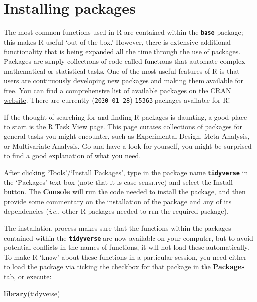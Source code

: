 \documentclass[
]{book}
\newenvironment{Shaded}{\begin{snugshade}}{\end{snugshade}}
\newcommand{\KeywordTok}[1]{\textcolor[rgb]{0.13,0.29,0.53}{\textbf{#1}}}
\newcommand{\NormalTok}[1]{#1}
\begin{document}
\hypertarget{installing-packages}{%
\section{Installing packages}\label{installing-packages}}

The most common functions used in R are contained within the \textbf{\texttt{base}} package; this makes R useful `out of the box.' However, there is extensive additional functionality that is being expanded all the time through the use of packages. Packages are simply collections of code called functions that automate complex mathematical or statistical tasks. One of the most useful features of R is that users are continuously developing new packages and making them available for free. You can find a comprehensive list of available packages on the \href{https://cran.r-project.org/web/packages/}{CRAN website}. There are currently (\texttt{2020-01-28}) \texttt{15363} packages available for R!

If the thought of searching for and finding R packages is daunting, a good place to start is the \href{http://cran.r-project.org/web/views/}{R Task View} page. This page curates collections of packages for general tasks you might encounter, such as Experimental Design, Meta-Analysis, or Multivariate Analysis. Go and have a look for yourself, you might be surprised to find a good explanation of what you need.

After clicking `Tools'/`Install Packages', type in the package name \textbf{\texttt{tidyverse}} in the `Packages' text box (note that it is case sensitive) and select the Install button. The \textbf{Console} will run the code needed to install the package, and then provide some commentary on the installation of the package and any of its dependencies (\emph{i.e.}, other R packages needed to run the required package).

The installation process makes sure that the functions within the packages contained within the \textbf{\texttt{tidyverse}} are now available on your computer, but to avoid potential conflicts in the names of functions, it will not load these automatically. To make R `know' about these functions in a particular session, you need either to load the package via ticking the checkbox for that package in the \textbf{Packages} tab, or execute:

\begin{Shaded}
\begin{Highlighting}[]
\KeywordTok{library}\NormalTok{(tidyverse)}
\end{Highlighting}
\end{Shaded}
\end{document}
